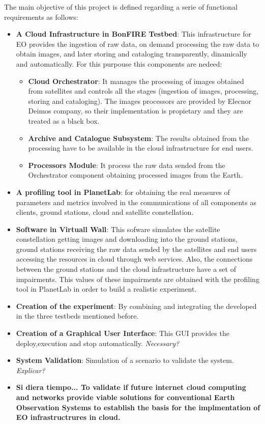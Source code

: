 The main objective of this project is defined regarding a serie of functional
requirements as follows:
\begin{itemize}
  
\item {\textbf{A Cloud Infrastructure in BonFIRE Testbed}: This
  infrastructure for EO provides the ingestion of raw data, on demand processing the raw
  data to obtain images, and later storing and cataloging transparently,
  dinamically and automatically. For this purpouse this components are nedeed:
}
\begin{itemize}

\item{\textbf{Cloud Orchestrator}: It manages the
  processing of images obtained from satellites and controls all the stages
  (ingestion of images, processing, storing and cataloging). The images
  processors are provided by Elecnor Deimos company, so their implementation is propietary and they are treated as a black box.}
\item {\textbf{Archive and Catalogue Subsystem}: The
  results obtained from the processing have to be available in the cloud
  infrastructure for end users.}
\item{\textbf{Processors Module}: It process the raw data sended from
  the Orchestrator component obtaining processed images from the Earth.}  
\end{itemize}
\item {\textbf{A profiling tool in PlanetLab}: for obtaining the real measures of
  parameters and metrics involved in the communications of all components as
  clients, ground stations, cloud and satellite constellation.}


\item {\textbf{Software in Virtuall Wall}: This sofware simulates the satellite
  constellation getting images and downloading into the ground stations, ground
  stations receiving the raw data sended by the satellites and end users
  accessing the resources in cloud through web services. Also, the connections
  between the ground stations and the cloud infrastructure have a set of
  impairments. This values of these impairments are obtained with the profiling tool in
  PlanetLab in order to build a  realistic experiment.}

\item {\textbf{Creation of the experiment}: By combining and integrating
  the developed in the three testbeds mentioned before.}

\item {\textbf{Creation of a Graphical User Interface}: This GUI provides
  the deploy,execution and stop automatically. \emph{Necessary?}} 

\item {\textbf{System Validation}: Simulation of a scenario to validate the
  system. \emph{Explicar?}}

\item \textbf{Si diera tiempo... To validate if future internet cloud computing
  and networks provide viable solutions for conventional Earth Observation
  Systems to establish the basis for the implmentation of EO infrastructrures in
  cloud.}

\end{itemize}

